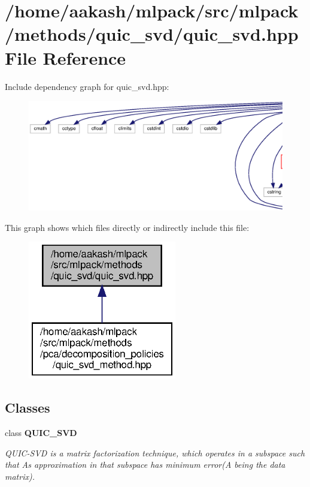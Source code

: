 \section{/home/aakash/mlpack/src/mlpack/methods/quic\+\_\+svd/quic\+\_\+svd.hpp File Reference}
\label{quic__svd_8hpp}
Include dependency graph for quic\+\_\+svd.\+hpp\+:
\nopagebreak
\begin{figure}[H]
\begin{center}
\leavevmode
\includegraphics[width=350pt]{quic__svd_8hpp__incl}
\end{center}
\end{figure}
This graph shows which files directly or indirectly include this file\+:
\nopagebreak
\begin{figure}[H]
\begin{center}
\leavevmode
\includegraphics[width=184pt]{quic__svd_8hpp__dep__incl}
\end{center}
\end{figure}
\subsection*{Classes}
\begin{DoxyCompactItemize}
\item 
class \textbf{ Q\+U\+I\+C\+\_\+\+S\+VD}
\begin{DoxyCompactList}\small\item\em Q\+U\+I\+C-\/\+S\+VD is a matrix factorization technique, which operates in a subspace such that A\textquotesingle{}s approximation in that subspace has minimum error(A being the data matrix). \end{DoxyCompactList}\end{DoxyCompactItemize}
